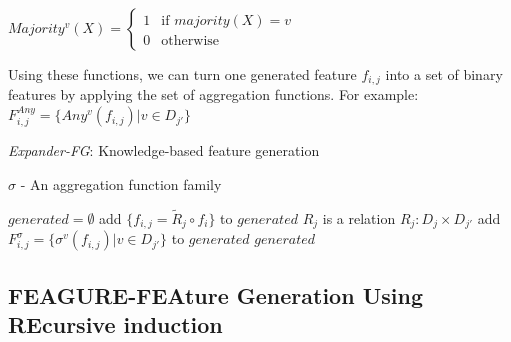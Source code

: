 \documentclass{article}
\theoremstyle{definition}
\begin{document}
$Majority^v(X)=\begin{cases} 1 &\mbox{if } majority(X)=v
\\ 
0 & \mbox{otherwise } \end{cases}$

Using these functions, we can turn one generated feature $f_{i,j}$ into a set of binary features by applying the set of aggregation functions. For example:  $F_{i,j}^{Any}=\{Any^v(f_{i,j})|v\in D_{j'}\}$


\begin{algorithm}[H]
	\caption{\emph{Expander-FG}: Knowledge-based feature generation}
	\label{code-compete}
	\small
	$\sigma$ - An aggregation function family
	\begin{algorithmic}
		\State $generated=\emptyset$
		\State add $\{f_{i,j}=\tilde{R}_j\circ f_i\}$ to $generated$
		\EndIf
		\Else \Comment $R_j$ is a relation $R_j:D_j\times D_{j'}$
		\State add $F^\sigma_{i,j}=\{\sigma^v(f_{i,j})|v\in D_{j'}\}$ to $generated$
		\EndIf
		\EndIf
		\EndFor
		\EndFor
		\State \Return $generated$ 
		\EndFunction
		
	\end{algorithmic}
\end{algorithm}

\subsection{FEAGURE-FEAture Generation Using REcursive induction}
\label{algorithm_section}
\end{document}
